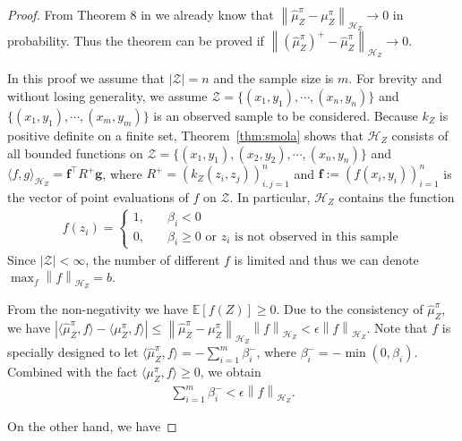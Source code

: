 \documentclass[a4paper]{article}
\renewcommand{\bf}{\mathbf}
\renewcommand{\cal}{\mathcal}
\newcommand{\bb}{\mathbb}
\newcommand{\norm}[1]{\left\lVert#1\right\rVert}
\newcommand{\T}{\intercal}
\newcommand{\thmref}[1]{Theorem~\ref{#1}}
\begin{document}
\begin{proof}
From Theorem 8 in \cite{fukumizu2011kernel} we already know that $\norm{\widehat{\mu}_Z^\pi-\mu_Z^\pi}_{\cal{H}_Z} \rightarrow 0$ in probability. Thus the theorem can be proved if $\norm{(\widehat{\mu}_Z^{\pi})^+ - \widehat{\mu}_Z^\pi}_{\cal{H}_Z} \rightarrow 0$. 

In this proof we assume that $|\cal{Z}| = n$ and the sample size is $m$. For brevity and without losing generality, we assume $\cal{Z} = \{ (x_1,y_1),\cdots,(x_n,y_n) \}$ and $\{ (x_1,y_1),\cdots,(x_m,y_m) \}$ is an observed sample to be considered. Because $k_Z$ is positive definite on a finite set, \thmref{thm:smola} shows that $\cal{H}_Z$ consists of all bounded functions on $\cal{Z} = \{ (x_1,y_1),(x_2,y_2),\cdots,(x_n,y_n) \}$ and $\langle f,g\rangle_{\cal{H}_Z} = \bf{f}^\T R^+ \bf{g}$, where $R^+ = (k_Z(z_i,z_j))_{i,j=1}^n$ and $\bf{f}:=(f(x_i,y_i))_{i=1}^n$ is the vector of point evaluations of $f$ on $\cal{Z}$. In particular, $\cal{H}_Z$ contains the function
\begin{align}
f(z_i) = \begin{cases}
1, \quad &\beta_i < 0\\
0,\quad &\text{$\beta_i \geq 0$ or $z_i$ is not observed in this sample}
\end{cases}
\end{align}
Since $|\cal{Z}|<\infty$, the number of different $f$ is limited and thus we can denote $\max_f \norm{f}_{\cal{H}_Z} = b$.

From the non-negativity we have $\bb{E}[f(Z)] \geq 0$. Due to the consistency of $\widehat{\mu}_Z^\pi$, we have $|\langle \widehat{\mu}_Z^\pi, f\rangle - \langle \mu_Z^\pi, f\rangle| \leq \norm{\widehat{\mu}_Z^\pi-\mu_Z^\pi}_{\cal{H}_Z}\norm{f}_{\cal{H}_Z} < \epsilon\norm{f}_{\cal{H}_Z}$. Note that $f$ is specially designed to let $\langle \widehat{\mu}_Z^\pi ,f\rangle = - \sum_{i=1}^m \beta_i^-$, where $\beta_i^- = -\min(0,\beta_i)$. Combined with the fact $\langle \mu_Z^\pi,f\rangle \geq 0$, we obtain
\begin{align}
\sum_{i=1}^m \beta_i^- < \epsilon \norm{f}_{\cal{H}_Z}.
\end{align}

On the other hand, we have


\end{proof}
\end{document}
